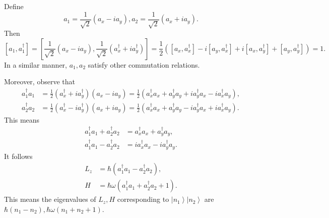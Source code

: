 \documentclass[phys334]{subfiles}
\begin{document}
    \np Define
    \begin{equation*}
        a_1 = \frac{1}{\sqrt{2}} \left( a_x-ia_y \right), a_2 = \frac{1}{\sqrt{2}} \left( a_x+ia_y \right).
    \end{equation*}
    Then
    \begin{equation*}
        \left[ a_1,a_1^{\dagger} \right] = \left[ \frac{1}{\sqrt{2}}\left( a_x-ia_y \right),\frac{1}{\sqrt{2}}\left( a_x^{\dagger}+ia_y^{\dagger} \right) \right] = \frac{1}{2} \left( \left[ a_x,a_x^{\dagger} \right] - i\left[ a_y,a_x^{\dagger} \right]+i\left[ a_x,a_y^{\dagger} \right]+\left[ a_y,a_y^{\dagger} \right] \right) = 1.
    \end{equation*}
    In a similar manner, $a_1,a_2$ satisfy other commutation relations.

    Moreover, observe that
    \begin{equation*}
        \begin{aligned}
            a_1^{\dagger}a_1 & = \frac{1}{2}\left( a_x^{\dagger}+ia_y^{\dagger} \right)\left( a_x-ia_y \right) = \frac{1}{2} \left( a_x^{\dagger}a_x+a_y^{\dagger}a_y+ia_y^{\dagger}a_x-ia_x^{\dagger}a_y \right), \\
            a_2^{\dagger}a_2 & = \frac{1}{2}\left( a_x^{\dagger}-ia_y^{\dagger} \right)\left( a_x+ia_y \right) = \frac{1}{2} \left( a_x^{\dagger}a_x+a_y^{\dagger}a_y-ia_y^{\dagger}a_x+ia_x^{\dagger}a_y \right).
        \end{aligned} 
    \end{equation*}
    This means
    \begin{equation*}
        \begin{aligned}
            a_1^{\dagger}a_1 + a_2^{\dagger}a_2 & = a_x^{\dagger}a_x + a_y^{\dagger}a_y, \\
            a_1^{\dagger}a_1 - a_2^{\dagger}a_2 & = ia_x^{\dagger}a_x - ia_y^{\dagger}a_y.
        \end{aligned} 
    \end{equation*}
    It follows
    \begin{equation*}
        \begin{aligned}
            L_z & = \hbar\left( a_1^{\dagger}a_1 - a_2^{\dagger}a_2 \right), \\
            H & = \hbar\omega\left( a_1^{\dagger}a_1+a_2^{\dagger}a_2+1 \right) .
        \end{aligned} 
    \end{equation*}
    This means the eigenvalues of $L_z,H$ corresponding to $\left| n_1 \right\rangle\left| n_2 \right\rangle$ are $\hbar\left( n_1-n_2 \right), \hbar\omega\left( n_1+n_2+1 \right)$.
\end{document}
